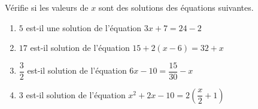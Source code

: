 \documentclass[../../syllabus_2.tex]{subfiles}
\begin{document}
%
\setcounter{exercise}{0}
\begin{exercise}
  Vérifie si les valeurs de $x$ sont des solutions des équations
  suivantes.
  \begin{enumerate}
    \item $5$ est-il une solution de l'équation $3x + 7 = 24 - 2$
    \item $17$ est-il solution de l'équation $15 + 2(x - 6) = 32 + x$
    \item $\dfrac{3}{2}$ est-il solution de l'équation
          $6x - 10 = \dfrac{15}{30} - x$
    \item $3$ est-il solution de l'équation
          $x^{2} + 2x - 10 = 2\left( \dfrac{x}{2} + 1 \right)$
  \end{enumerate}
\end{exercise}
\end{document}
